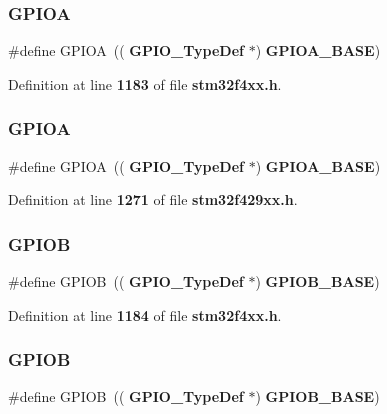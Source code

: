\subsubsection{G\+P\+I\+OA\hspace{0.1cm}{\footnotesize\ttfamily [1/2]}}
{\footnotesize\ttfamily \#define G\+P\+I\+OA~((\textbf{ G\+P\+I\+O\+\_\+\+Type\+Def} $\ast$) \textbf{ G\+P\+I\+O\+A\+\_\+\+B\+A\+SE})}



Definition at line \textbf{ 1183} of file \textbf{ stm32f4xx.\+h}.

\mbox{\label{group__Peripheral__declaration_gac485358099728ddae050db37924dd6b7}} 
\subsubsection{G\+P\+I\+OA\hspace{0.1cm}{\footnotesize\ttfamily [2/2]}}
{\footnotesize\ttfamily \#define G\+P\+I\+OA~((\textbf{ G\+P\+I\+O\+\_\+\+Type\+Def} $\ast$) \textbf{ G\+P\+I\+O\+A\+\_\+\+B\+A\+SE})}



Definition at line \textbf{ 1271} of file \textbf{ stm32f429xx.\+h}.

\mbox{\label{group__Peripheral__declaration_ga68b66ac73be4c836db878a42e1fea3cd}} 
\subsubsection{G\+P\+I\+OB\hspace{0.1cm}{\footnotesize\ttfamily [1/2]}}
{\footnotesize\ttfamily \#define G\+P\+I\+OB~((\textbf{ G\+P\+I\+O\+\_\+\+Type\+Def} $\ast$) \textbf{ G\+P\+I\+O\+B\+\_\+\+B\+A\+SE})}



Definition at line \textbf{ 1184} of file \textbf{ stm32f4xx.\+h}.

\mbox{\label{group__Peripheral__declaration_ga68b66ac73be4c836db878a42e1fea3cd}} 
\subsubsection{G\+P\+I\+OB\hspace{0.1cm}{\footnotesize\ttfamily [2/2]}}
{\footnotesize\ttfamily \#define G\+P\+I\+OB~((\textbf{ G\+P\+I\+O\+\_\+\+Type\+Def} $\ast$) \textbf{ G\+P\+I\+O\+B\+\_\+\+B\+A\+SE})}



